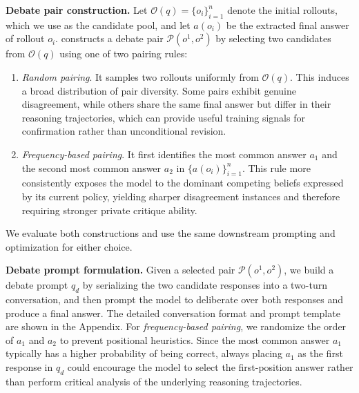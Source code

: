 \textbf{Debate pair construction.}
Let $\mathcal{O}(q)=\{o_i\}_{i=1}^n$ denote the initial rollouts, which we use as the candidate pool, and let $a(o_i)$ be the extracted final answer of rollout $o_i$.
\SDRL{} constructs a debate pair $\mathcal{P}(o^1, o^2)$ by selecting two candidates from $\mathcal{O}(q)$ using one of two pairing rules:
\begin{enumerate}
    \item \emph{Random pairing}. It samples two rollouts uniformly from $\mathcal{O}(q)$.
    This induces a broad distribution of pair diversity.
    Some pairs exhibit genuine disagreement, while others share the same final answer but differ in their reasoning trajectories, which can provide useful training signals for confirmation rather than unconditional revision.
    \item \emph{Frequency-based pairing}. It first identifies the most common answer $a_1$ and the second most common answer $a_2$ in $\{a(o_i)\}_{i=1}^n$.
    This rule more consistently exposes the model to the dominant competing beliefs expressed by its current policy, yielding sharper disagreement instances and therefore requiring stronger private critique ability.
\end{enumerate}
 We evaluate both constructions and use the same downstream prompting and optimization for either choice. 

\textbf{Debate prompt formulation.}
Given a selected pair $\mathcal{P}(o^1, o^2)$, we build a debate prompt $q_d$ by serializing the two candidate responses into a two-turn conversation, and then prompt the model to deliberate over both responses and produce a final answer. The detailed conversation format and prompt template are shown in the Appendix. For \emph{frequency-based pairing}, we randomize the order of $a_1$ and $a_2$ to prevent positional heuristics. Since the most common answer $a_1$ typically has a higher probability of being correct, always placing $a_1$ as the first response in $q_d$ could encourage the model to select the first-position answer rather than perform critical analysis of the underlying reasoning trajectories.
